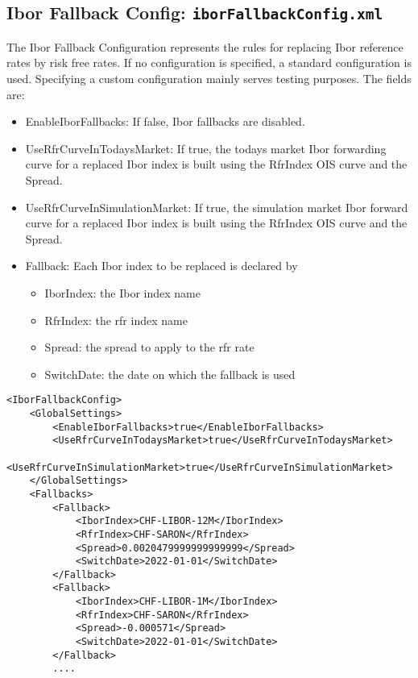 \subsection{Ibor Fallback Config: {\tt iborFallbackConfig.xml}}
\label{sec:iborfallbackconfig}

The Ibor Fallback Configuration represents the rules for replacing Ibor reference rates by risk free rates. If no
configuration is specified, a standard configuration is used. Specifying a custom configuration mainly serves
testing purposes. The fields are:

\begin{itemize}
\item EnableIborFallbacks: If false, Ibor fallbacks are disabled.
\item UseRfrCurveInTodaysMarket: If true, the todays market Ibor forwarding curve for a replaced Ibor index is built using the RfrIndex OIS curve and the Spread.
\item UseRfrCurveInSimulationMarket: If true, the simulation market Ibor forward curve for a replaced Ibor index is built using the RfrIndex OIS curve and the Spread.
\item Fallback: Each Ibor index to be replaced is declared by
  \begin{itemize}
  \item IborIndex: the Ibor index name
  \item RfrIndex: the rfr index name
  \item Spread: the spread to apply to the rfr rate
  \item SwitchDate: the date on which the fallback is used
  \end{itemize}
\end{itemize}

\begin{verbatim}
<IborFallbackConfig>
	<GlobalSettings>
		<EnableIborFallbacks>true</EnableIborFallbacks>
		<UseRfrCurveInTodaysMarket>true</UseRfrCurveInTodaysMarket>
		<UseRfrCurveInSimulationMarket>true</UseRfrCurveInSimulationMarket>
	</GlobalSettings>
	<Fallbacks>
		<Fallback>
			<IborIndex>CHF-LIBOR-12M</IborIndex>
			<RfrIndex>CHF-SARON</RfrIndex>
			<Spread>0.0020479999999999999</Spread>
			<SwitchDate>2022-01-01</SwitchDate>
		</Fallback>
		<Fallback>
			<IborIndex>CHF-LIBOR-1M</IborIndex>
			<RfrIndex>CHF-SARON</RfrIndex>
			<Spread>-0.000571</Spread>
			<SwitchDate>2022-01-01</SwitchDate>
        </Fallback>
        ....
\end{verbatim}
